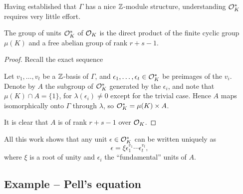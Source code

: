 Having established that $\Gamma$ has a nice $\mathbb{Z}$-module structure, understanding $\mathcal{O}^*_K$ requires very little effort.

\begin{thm}
	The group of units $\mathcal{O}^*_K$ of $\mathcal{O}_K$ is the direct product of the finite cyclic group $\mu(K)$ and a free abelian group of rank $r+s-1$.
\end{thm}
\begin{proof}
	Recall the exact sequence
	\begin{center}
	\end{center}
	Let $v_1,\dots,v_t$ be a $\mathbb{Z}$-basis of $\Gamma$, and $\epsilon_1,\dots,\epsilon_t\in\mathcal{O}^*_K$ be preimages of the $v_i$. Denote by $A$ the subgroup of $\mathcal{O}^*_K$ generated by the $\epsilon_i$, and note that $\mu(K)\cap A=\{1\}$, for $\lambda(\epsilon_i)\neq 0$ except for the trivial case. Hence $A$ maps isomorphically onto $\Gamma$ through $\lambda$, so $\mathcal{O}^*_K=\mu(K)\times A$.

	It is clear that $A$ is of rank $r+s-1$ over $\mathcal{O}_K$.

\end{proof}

All this work shows that any unit $\epsilon\in\mathcal{O}^*_K$ can be written uniquely as
\[
	\epsilon = \xi \epsilon_1^{v_1}\cdots\epsilon_t^{v_t},
\]
where $\xi$ is a root of unity and $\epsilon_i$ the ``fundamental'' units of $A$.


\subsection{Example -- Pell's equation}

